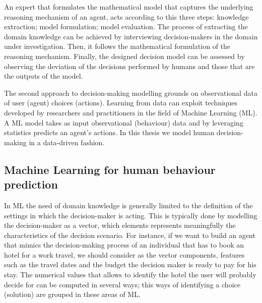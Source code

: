 An expert that formulates the mathematical model that captures the underlying reasoning mechanism of an agent, acts according to this three steps: knowledge extraction; model formulation; model evaluation. The process of extracting the domain knowledge can be achieved by interviewing decision-makers in the domain under investigation. Then, it follows the mathematical formulation of the reasoning mechanism. Finally, the designed decision model can be assessed by observing the deviation of the decisions performed by humans and those that are the outputs of the model.

The second approach to decision-making modelling grounds on observational data of user (agent) choices (actions).
Learning from data can exploit techniques developed by researchers and practitioners in the field of Machine Learning (ML). A ML model takes as input observational (behaviour) data and by leveraging statistics
predicts an agent's actions. In this thesis we model human decision-making in a data-driven fashion. 

\subsection{Machine Learning for human behaviour prediction}
In ML the need of domain knowledge is generally limited to the definition of the settings in which the decision-maker is acting. This is typically done by modelling the decision-maker as a vector, 
which elements  represents meaningfully the characteristics of the decision scenario. For instance, if we want to build an agent that mimics the decision-making process of an individual that has to book an hotel for a work travel,
we should consider as the vector components, features such as the travel dates and the budget the decision maker is ready to pay for his stay. The numerical values that allows to identify the hotel the user will probably decide for can be computed in several ways; this ways of identifying a choice (solution) are grouped in these areas of ML.
\newline


